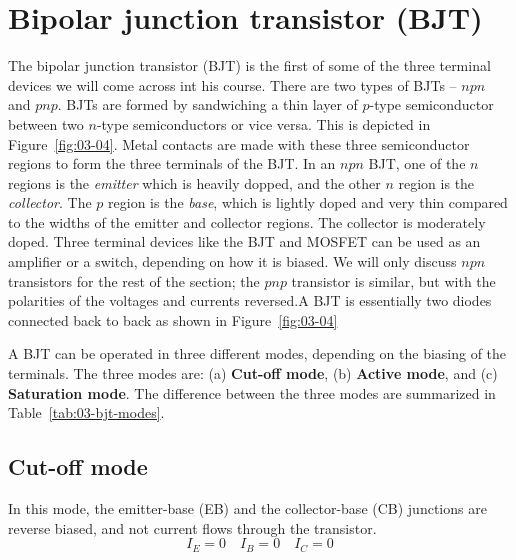 \section{Bipolar junction transistor (BJT)}
The bipolar junction transistor (BJT) is the first of some of the three terminal devices we will come across int his course. There are two types of BJTs -- $npn$ and $pnp$. BJTs are formed by sandwiching a thin layer of $p$-type semiconductor between two $n$-type semiconductors or vice versa. This is depicted in Figure~\ref{fig:03-04}. Metal contacts are made with these three semiconductor regions to form the three terminals of the BJT. In an $npn$ BJT, one of the  $n$ regions is the \textit{emitter} which is heavily dopped, and the other $n$ region is the \textit{collector}. The $p$ region is the \textit{base}, which is lightly doped and very thin compared to the widths of the emitter and collector regions. The collector is moderately doped. Three terminal devices like the BJT and MOSFET can be used as an amplifier or a switch, depending on how it is biased. We will only discuss $npn$ transistors for the rest of the section; the $pnp$ transistor is similar, but with the polarities of the voltages and currents reversed.A BJT is essentially two diodes connected back to back as shown in Figure~\ref{fig:03-04}

A BJT can be operated in three different modes, depending on the biasing of the terminals. The three modes are: (a) \textbf{Cut-off mode}, (b) \textbf{Active mode}, and (c) \textbf{Saturation mode}. The difference between the three modes are summarized in Table~\ref{tab:03-bjt-modes}.
\subsection{Cut-off mode}
In this mode, the emitter-base (EB) and the collector-base (CB) junctions are reverse biased, and not current flows through the transistor.
\begin{equation}
    I_E = 0 \quad I_B = 0 \quad I_C = 0
    \label{eq:03-bjt-cutoff}
\end{equation}
